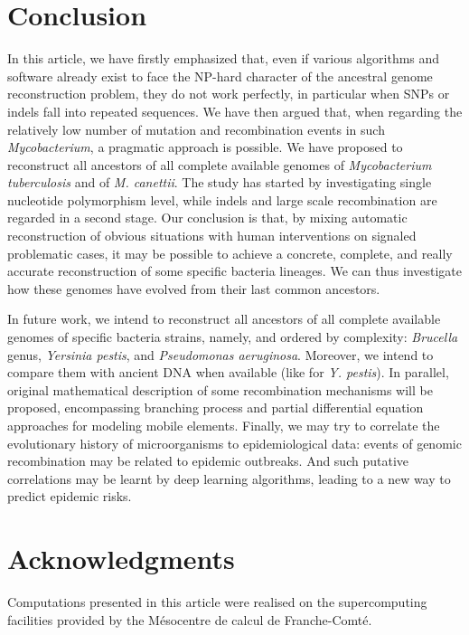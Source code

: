 \documentclass[runningheads,a4paper]{llncs}
\begin{document}
\section{Conclusion}
In this article, we have firstly emphasized that, even if various algorithms and software already exist to face the NP-hard character of the ancestral genome reconstruction problem, they do not work perfectly, in particular when SNPs or indels fall into repeated sequences. We have then argued that, when regarding the relatively low number of mutation and recombination events in such \textit{Mycobacterium}, a pragmatic approach is possible. 
We have proposed to reconstruct all ancestors of all complete available genomes of \textit{Mycobacterium tuberculosis} and of  \textit{M. canettii}. The study has started by investigating single nucleotide polymorphism level, while indels and large scale recombination are regarded in a second stage. 
Our conclusion is that, by mixing automatic reconstruction of obvious situations with human interventions on signaled problematic cases, it may be possible to achieve a concrete, complete, and really accurate reconstruction of some specific bacteria lineages.
We can thus investigate how these genomes have evolved from their last common ancestors. %

In future work, we intend to reconstruct all ancestors of all complete available genomes of specific bacteria strains, namely, and ordered by complexity: \textit{Brucella} genus, \textit{Yersinia pestis}, and \textit{Pseudomonas aeruginosa}. Moreover, we intend to compare them with ancient DNA when available (like for \textit{Y. pestis}). In parallel, original mathematical description of some recombination mechanisms will be proposed, encompassing branching process and partial differential equation approaches for modeling mobile elements. Finally, we may try to correlate the evolutionary history of microorganisms to epidemiological data: events of genomic recombination may be related to epidemic outbreaks. And such putative correlations may be learnt by deep learning algorithms, leading to a new way to predict epidemic risks.

\section*{Acknowledgments}

 
Computations presented in this article were realised
on  the  supercomputing  facilities  provided  by
the M\'esocentre de calcul de Franche-Comt\'e.





\end{document}
